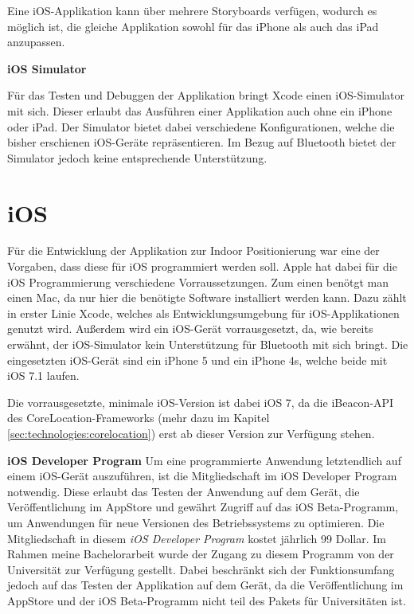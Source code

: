 Eine iOS-Applikation kann über mehrere Storyboards verfügen, wodurch es möglich ist, die gleiche Applikation sowohl für das iPhone als auch das iPad anzupassen.


\textbf{iOS Simulator}

Für das Testen und Debuggen der Applikation bringt Xcode einen iOS-Simulator mit sich. Dieser erlaubt das Ausführen einer Applikation auch ohne ein iPhone oder iPad. Der Simulator bietet dabei verschiedene Konfigurationen, welche die bisher erschienen iOS-Geräte repräsentieren. Im Bezug auf Bluetooth bietet der Simulator jedoch keine entsprechende Unterstützung.

\section{iOS}
\label{sec:technologies:iosandxcode}
Für die Entwicklung der Applikation zur Indoor Positionierung war eine der Vorgaben, dass diese für iOS programmiert werden soll.
Apple hat dabei für die iOS Programmierung verschiedene Vorraussetzungen. Zum einen benötgt man einen Mac, da nur hier die benötigte Software installiert werden kann.
Dazu zählt in erster Linie Xcode, welches als Entwicklungsumgebung für iOS-Applikationen genutzt wird. 
Außerdem wird ein iOS-Gerät vorrausgesetzt, da, wie bereits erwähnt, der iOS-Simulator kein Unterstützung für Bluetooth mit sich bringt. 
Die eingesetzten iOS-Gerät sind ein iPhone 5 und ein iPhone 4s, welche beide mit iOS 7.1 laufen.

Die vorrausgesetzte, minimale iOS-Version ist dabei iOS 7, da die iBeacon-API des CoreLocation-Frameworks (mehr dazu im Kapitel \ref{sec:technologies:corelocation}) erst ab dieser Version zur Verfügung stehen.

\textbf{iOS Developer Program}
Um eine programmierte Anwendung letztendlich auf einem iOS-Gerät auszuführen, ist die Mitgliedschaft im iOS Developer Program notwendig.
Diese erlaubt das Testen der Anwendung auf dem Gerät, die Veröffentlichung im AppStore und gewährt Zugriff auf das iOS Beta-Programm, um Anwendungen für neue Versionen des Betriebssystems zu optimieren.
Die Mitgliedschaft in diesem \emph{iOS Developer Program} kostet jährlich 99 Dollar. 
Im Rahmen meine Bachelorarbeit wurde der Zugang zu diesem Programm von der Universität zur Verfügung gestellt. Dabei beschränkt sich der Funktionsumfang jedoch auf das Testen der Applikation auf dem Gerät, da die Veröffentlichung im AppStore und der iOS Beta-Programm nicht teil des Pakets für Universitäten ist.


